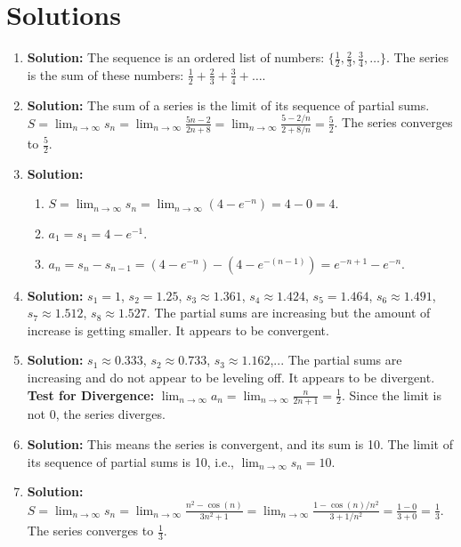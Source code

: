 \documentclass[12pt]{article}
\begin{document}
\newpage
\section{Solutions}

\begin{enumerate}
    \item \textbf{Solution:} The sequence is an ordered list of numbers: $\{\frac{1}{2}, \frac{2}{3}, \frac{3}{4}, \dots\}$. The series is the sum of these numbers: $\frac{1}{2} + \frac{2}{3} + \frac{3}{4} + \dots$.

    \item \textbf{Solution:} The sum of a series is the limit of its sequence of partial sums. $S = \lim_{n\to\infty} s_n = \lim_{n\to\infty} \frac{5n-2}{2n+8} = \lim_{n\to\infty} \frac{5 - 2/n}{2 + 8/n} = \frac{5}{2}$. The series converges to $\frac{5}{2}$.

    \item \textbf{Solution:} 
    \begin{enumerate}
        \item $S = \lim_{n\to\infty} s_n = \lim_{n\to\infty} (4 - e^{-n}) = 4 - 0 = 4$.
        \item $a_1 = s_1 = 4 - e^{-1}$.
        \item $a_n = s_n - s_{n-1} = (4 - e^{-n}) - (4 - e^{-(n-1)}) = e^{-n+1} - e^{-n}$.
    \end{enumerate}

    \item \textbf{Solution:} $s_1 = 1$, $s_2 = 1.25$, $s_3 \approx 1.361$, $s_4 \approx 1.424$, $s_5 = 1.464$, $s_6 \approx 1.491$, $s_7 \approx 1.512$, $s_8 \approx 1.527$. The partial sums are increasing but the amount of increase is getting smaller. It appears to be convergent.

    \item \textbf{Solution:} $s_1 \approx 0.333$, $s_2 \approx 0.733$, $s_3 \approx 1.162$,... The partial sums are increasing and do not appear to be leveling off. It appears to be divergent.
    \textbf{Test for Divergence:} $\lim_{n\to\infty} a_n = \lim_{n\to\infty} \frac{n}{2n+1} = \frac{1}{2}$. Since the limit is not 0, the series diverges.
    
    \item \textbf{Solution:} This means the series is convergent, and its sum is 10. The limit of its sequence of partial sums is 10, i.e., $\lim_{n\to\infty} s_n = 10$.

    \item \textbf{Solution:} $S = \lim_{n\to\infty} s_n = \lim_{n\to\infty} \frac{n^2 - \cos(n)}{3n^2+1} = \lim_{n\to\infty} \frac{1 - \cos(n)/n^2}{3 + 1/n^2} = \frac{1 - 0}{3 + 0} = \frac{1}{3}$. The series converges to $\frac{1}{3}$.


\end{enumerate}
\end{document}

